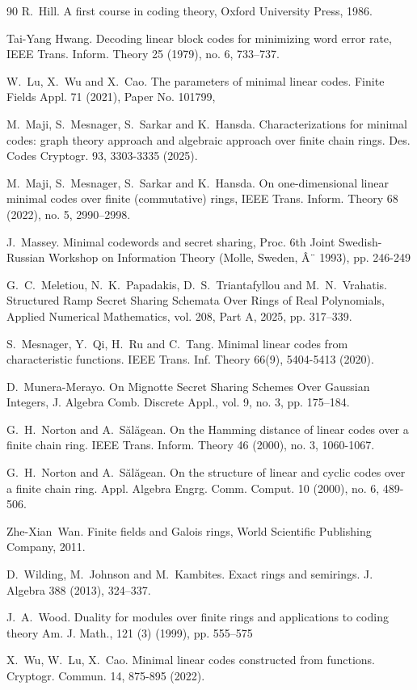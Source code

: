 \documentclass[10pt]{article}
\theoremstyle{definition}
\begin{document}
\begin{thebibliography}{90}
R.~Hill. A first course in coding theory, Oxford University Press, 1986.

Tai-Yang Hwang. Decoding linear block codes for minimizing word error rate, IEEE Trans. Inform. Theory 25 (1979), no. 6, 733--737.

W.~Lu, X.~Wu and X.~Cao. The parameters of minimal linear codes. Finite Fields Appl. 71 (2021), Paper No. 101799,

M.~Maji, S.~Mesnager, S.~Sarkar and K.~Hansda. Characterizations for minimal codes: graph theory approach and algebraic approach over finite chain rings. Des. Codes Cryptogr. 93, 3303-3335 (2025).

M.~Maji, S.~Mesnager, S.~Sarkar and K.~Hansda. On one-dimensional linear minimal codes over finite (commutative) rings, IEEE Trans. Inform. Theory 68 (2022), no. 5, 2990--2998.

J.~Massey. Minimal codewords and secret sharing, Proc. 6th Joint Swedish-Russian Workshop on Information Theory (Molle, Sweden, Â¨ 1993), pp. 246-249

G.~C.~Meletiou, N.~K.~Papadakis, D.~S.~Triantafyllou and M.~N.~Vrahatis. Structured Ramp Secret Sharing Schemata Over Rings of Real Polynomials, Applied Numerical Mathematics, vol. 208, Part A, 2025, pp. 317--339.

S.~Mesnager, Y.~Qi, H.~Ru and C.~Tang. Minimal linear codes from characteristic functions. IEEE Trans. Inf. Theory 66(9), 5404-5413 (2020).

D.~Munera-Merayo. On Mignotte Secret Sharing Schemes Over Gaussian Integers, J. Algebra Comb. Discrete Appl., vol. 9, no. 3, pp. 175--184.

G.~H.~Norton and A.~Sălăgean. On the Hamming distance of linear codes over a finite chain ring. IEEE Trans. Inform. Theory 46 (2000), no. 3, 1060-1067.

G.~H.~Norton and A.~Sălăgean. On the structure of linear and cyclic codes over a finite chain ring. Appl. Algebra Engrg. Comm. Comput. 10 (2000), no. 6, 489-506.

Zhe-Xian~Wan. Finite fields and Galois rings, World Scientific Publishing Company, 2011.

D.~Wilding, M.~Johnson and M.~Kambites. Exact rings and semirings. J. Algebra 388 (2013), 324--337.

J.~A.~Wood. Duality for modules over finite rings and applications to coding theory Am. J. Math., 121 (3) (1999), pp. 555--575

X.~Wu, W.~Lu, X.~Cao. Minimal linear codes constructed from functions. Cryptogr. Commun. 14, 875-895 (2022).

\end{thebibliography}
\end{document}
